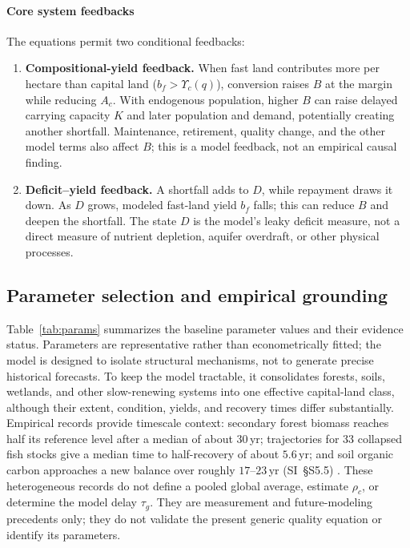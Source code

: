 \documentclass[preprint,12pt,authoryear]{elsarticle}
\newcommand{\Ups}{\Upsilon_c}
\begin{document}
\paragraph{Core system feedbacks} The equations permit two conditional feedbacks:
\begin{enumerate}
  \item \textbf{Compositional-yield feedback.} When fast land contributes more per hectare than capital land ($b_f>\Ups(q)$), conversion raises $B$ at the margin while reducing $A_c$. With endogenous population, higher $B$ can raise delayed carrying capacity $K$ and later population and demand, potentially creating another shortfall. Maintenance, retirement, quality change, and the other model terms also affect $B$; this is a model feedback, not an empirical causal finding.
  \item \textbf{Deficit--yield feedback.} A shortfall adds to $D$, while repayment draws it down. As $D$ grows, modeled fast-land yield $b_f$ falls; this can reduce $B$ and deepen the shortfall. The state $D$ is the model's leaky deficit measure, not a direct measure of nutrient depletion, aquifer overdraft, or other physical processes.
\end{enumerate}

\subsection{Parameter selection and empirical grounding}\label{sec:params}

Table~\ref{tab:params} summarizes the baseline parameter values and their evidence status. Parameters are representative rather than econometrically fitted; the model is designed to isolate structural mechanisms, not to generate precise historical forecasts. To keep the model tractable, it consolidates forests, soils, wetlands, and other slow-renewing systems into one effective capital-land class, although their extent, condition, yields, and recovery times differ substantially. Empirical records provide timescale context: secondary forest biomass reaches half its reference level after a median of about $30$\,yr; trajectories for 33 collapsed fish stocks give a median time to half-recovery of about $5.6$\,yr; and soil organic carbon approaches a new balance over roughly $17$--$23$\,yr (SI~\S S5.5) \citep{Poorter2016,HutchingsReynolds2004,Neubauer2013,Poeplau2011}. These heterogeneous records do not define a pooled global average, estimate $\rho_c$, or determine the model delay $\tau_g$. They are measurement and future-modeling precedents only; they do not validate the present generic quality equation or identify its parameters.
\end{document}
